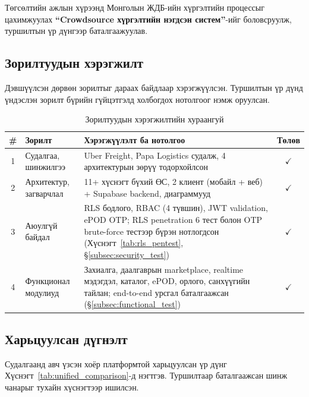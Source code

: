 Төгсөлтийн ажлын хүрээнд Монголын ЖДБ-ийн хүргэлтийн процессыг цахимжуулах \textbf{``Crowdsource хүргэлтийн нэгдсэн систем''}-ийг боловсруулж, туршилтын үр дүнгээр баталгаажуулав.

\subsection{Зорилтуудын хэрэгжилт}

Дэвшүүлсэн дөрвөн зорилтыг дараах байдлаар хэрэгжүүлсэн. Туршилтын үр дүнд үндэслэн зорилт бүрийн гүйцэтгэлд холбогдох нотолгоог нэмж оруулсан.

\begin{table}[H]
\centering
\renewcommand{\arraystretch}{1.3}
\caption{Зорилтуудын хэрэгжилтийн хураангуй}
\label{tab:objectives_summary}
\begin{tabular}{|c|p{3.5cm}|p{7.5cm}|c|}
\hline
\textbf{\#} & \textbf{Зорилт} & \textbf{Хэрэгжүүлэлт ба нотолгоо} & \textbf{Төлөв} \\
\hline
1 & Судалгаа, шинжилгээ & Uber Freight, Papa Logistics судалж, 4 архитектурын зөрүү тодорхойлсон & $\checkmark$ \\
\hline
2 & Архитектур, загварчлал & 11+ хүснэгт бүхий ӨС, 2 клиент (мобайл + веб) + Supabase backend, диаграммууд & $\checkmark$ \\
\hline
3 & Аюулгүй байдал & RLS бодлого, RBAC (4 түвшин), JWT validation, ePOD OTP; RLS penetration 6 тест болон OTP brute-force тестээр бүрэн нотлогдсон (Хүснэгт~\ref{tab:rls_pentest}, \S\ref{subsec:security_test}) & $\checkmark$ \\
\hline
4 & Функционал модулиуд & Захиалга, даалгаврын marketplace, realtime мэдэгдэл, каталог, ePOD, орлого, санхүүгийн тайлан; end-to-end урсгал баталгаажсан (\S\ref{subsec:functional_test}) & $\checkmark$ \\
\hline
\end{tabular}
\end{table}

\subsection{Харьцуулсан дүгнэлт}

Судалгаанд авч үзсэн хоёр платформтой харьцуулсан үр дүнг Хүснэгт~\ref{tab:unified_comparison}-д нэгтгэв. Туршилтаар баталгаажсан шинж чанарыг тухайн хүснэгтээр ишилсэн.

